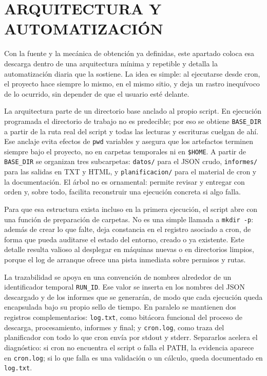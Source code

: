\chapter{ARQUITECTURA Y AUTOMATIZACIÓN}

Con la fuente y la mecánica de obtención ya definidas, este apartado coloca esa descarga dentro de una arquitectura mínima y repetible y detalla la automatización diaria que la sostiene. La idea es simple: al ejecutarse desde cron, el proyecto hace siempre lo mismo, en el mismo sitio, y deja un rastro inequívoco de lo ocurrido, sin depender de que el usuario esté delante.

La arquitectura parte de un directorio base anclado al propio script. En ejecución programada el directorio de trabajo no es predecible; por eso se obtiene \texttt{BASE\_DIR} a partir de la ruta real del script y todas las lecturas y escrituras cuelgan de ahí. Ese anclaje evita efectos de \texttt{pwd} variables y asegura que los artefactos terminen siempre bajo el proyecto, no en carpetas temporales ni en \texttt{\$HOME}. A partir de \texttt{BASE\_DIR} se organizan tres subcarpetas: \texttt{datos/} para el JSON crudo, \texttt{informes/} para las salidas en TXT y HTML, y \texttt{planificacion/} para el material de cron y la documentación. El árbol no es ornamental: permite revisar y entregar con orden y, sobre todo, facilita reconstruir una ejecución concreta si algo falla.

Para que esa estructura exista incluso en la primera ejecución, el script abre con una función de preparación de carpetas. No es una simple llamada a \texttt{mkdir -p}: además de crear lo que falte, deja constancia en el registro asociado a cron, de forma que pueda auditarse el estado del entorno, creado o ya existente. Este detalle resulta valioso al desplegar en máquinas nuevas o en directorios limpios, porque el log de arranque ofrece una pista inmediata sobre permisos y rutas.

La trazabilidad se apoya en una convención de nombres alrededor de un identificador temporal \texttt{RUN\_ID}. Ese valor se inserta en los nombres del JSON descargado y de los informes que se generarán, de modo que cada ejecución queda encapsulada bajo su propio sello de tiempo. En paralelo se mantienen dos registros complementarios: \texttt{log.txt}, como bitácora funcional del proceso de descarga, procesamiento, informes y final; y \texttt{cron.log}, como traza del planificador con todo lo que cron envía por stdout y stderr. Separarlos acelera el diagnóstico: si cron no encuentra el script o falla el PATH, la evidencia aparece en \texttt{cron.log}; si lo que falla es una validación o un cálculo, queda documentado en \texttt{log.txt}.

